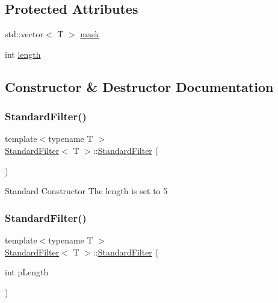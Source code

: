 \subsection*{Protected Attributes}
\begin{DoxyCompactItemize}
\item 
std\+::vector$<$ T $>$ \hyperlink{class_standard_filter_afc83cf6d1aa9cf9a1ae4a8c476d8a66d}{mask}
\item 
int \hyperlink{class_standard_filter_aa693971cea1c7c485a19928fd77a91c7}{length}
\end{DoxyCompactItemize}


\subsection{Constructor \& Destructor Documentation}
\mbox{\label{class_standard_filter_a7ccdce74856a1bdfa877bcec14b5c98b}} 
\subsubsection{\texorpdfstring{Standard\+Filter()}{StandardFilter()}\hspace{0.1cm}{\footnotesize\ttfamily [1/3]}}
{\footnotesize\ttfamily template$<$typename T $>$ \\
\hyperlink{class_standard_filter}{Standard\+Filter}$<$ T $>$\+::\hyperlink{class_standard_filter}{Standard\+Filter} (\begin{DoxyParamCaption}{ }\end{DoxyParamCaption})}

Standard Constructor The length is set to 5 \mbox{\label{class_standard_filter_acbc237007e90073c4306e748d73d7eaf}} 
\subsubsection{\texorpdfstring{Standard\+Filter()}{StandardFilter()}\hspace{0.1cm}{\footnotesize\ttfamily [2/3]}}
{\footnotesize\ttfamily template$<$typename T $>$ \\
\hyperlink{class_standard_filter}{Standard\+Filter}$<$ T $>$\+::\hyperlink{class_standard_filter}{Standard\+Filter} (\begin{DoxyParamCaption}\item[{int}]{p\+Length }\end{DoxyParamCaption})}

